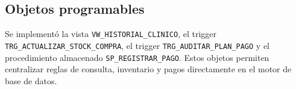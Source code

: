 \subsection{Objetos programables}

Se implementó la vista \texttt{VW\_HISTORIAL\_CLINICO}, el trigger \texttt{TRG\_ACTUALIZAR\_STOCK\_COMPRA}, el trigger \texttt{TRG\_AUDITAR\_PLAN\_PAGO} y el procedimiento almacenado \texttt{SP\_REGISTRAR\_PAGO}. Estos objetos permiten centralizar reglas de consulta, inventario y pagos directamente en el motor de base de datos.
